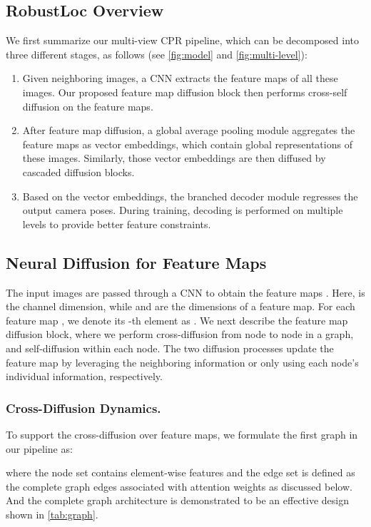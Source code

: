 \documentclass[letterpaper]{article} \usepackage{aaai23}  \usepackage{times}  \usepackage{helvet}  \usepackage{courier}  \usepackage[hyphens]{url}  \usepackage{graphicx} \urlstyle{rm} \def\UrlFont{\rm}  \usepackage{natbib}  \usepackage{caption} \frenchspacing  \setlength{\pdfpagewidth}{8.5in} \setlength{\pdfpageheight}{11in} \usepackage{booktabs}
\theoremstyle{remark}
\theoremstyle{plain}
\begin{document}
\subsection{RobustLoc Overview}
We first summarize our multi-view CPR pipeline, which can be decomposed into three different stages, as follows (see \cref{fig:model} and \cref{fig:multi-level}): 
\begin{enumerate}
\item Given  neighboring images, a CNN extracts the feature maps of all these images. Our proposed feature map diffusion block then performs cross-self diffusion on the feature maps.
\item After feature map diffusion, a global average pooling module aggregates the feature maps as vector embeddings, which contain global representations of these images. Similarly, those vector embeddings are then diffused by cascaded diffusion blocks. 
\item Based on the vector embeddings, the branched decoder module regresses the output camera poses. During training, decoding is performed on multiple levels to provide better feature constraints.
\end{enumerate}




\subsection{Neural Diffusion for Feature Maps}
 The input images  are passed through a CNN to obtain the feature maps . Here,  is the channel dimension, while  and  are the dimensions of a feature map. For each feature map , we denote its -th element as . We next describe the feature map diffusion block, where we perform cross-diffusion from node to node in a graph, and self-diffusion within each node. The two diffusion processes update the feature map by leveraging the neighboring information or only using each node's individual information, respectively.
\subsubsection{Cross-Diffusion Dynamics.}
To support the cross-diffusion over feature maps, we formulate the first graph in our pipeline as:

where the node set  contains element-wise features  and the edge set  is defined as the complete graph edges associated with attention weights as discussed below. And the complete graph architecture is demonstrated to be an effective design shown in \cref{tab:graph}.
\end{document}

